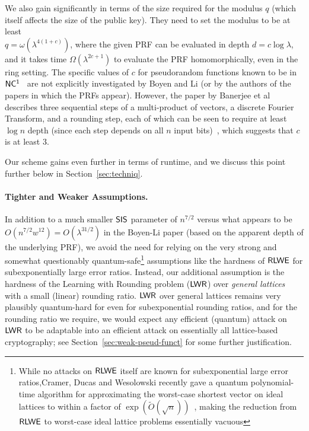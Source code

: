 We also gain significantly in terms of the size required for the
modulus $q$ (which itself affects the size of the public key). They
need to set the modulus to be at least\\ $q=\omega(\lambda^{4(1+c)})$,
where the given PRF can be evaluated in depth $d=c\log{\lambda}$, and
it takes time $\Omega(\lambda^{2c+1})$ to evaluate the PRF
homomorphically, even in the ring setting. The specific values of $c$
for pseudorandom functions known to be in
$\mathsf{NC^{1}}$~\cite{DBLP:conf/eurocrypt/BanerjeePR12,DBLP:conf/crypto/0001P14,DBLP:journals/jacm/NaorR04,DBLP:conf/crypto/DottlingS15}
are not explicitly investigated by Boyen and Li (or by the authors of
the papers in which the PRFs appear). However, the paper by Banerjee
et al describes three sequential steps of a multi-product of vectors,
a discrete Fourier Transform, and a rounding step, each of which can
be seen to require at least $\log{n}$ depth (since each step depends
on all $n$ input bits)~\cite{DBLP:journals/siamcomp/ReifT92}, which suggests that $c$ is at least $3$.


Our scheme gains even further in terms of runtime, and we discuss this point further below in Section~\ref{sec:techniq}.

\paragraph{Tighter and Weaker Assumptions.}


In addition to a much smaller $\mathsf{SIS}$ parameter of $n^{7/2}$ versus
what appears to be $O(n^{7/2}w^{12})=O(\lambda^{31/2})$ in the
Boyen-Li paper (based on the apparent depth of the underlying PRF), we
avoid the need for relying on the very strong and somewhat
questionably quantum-safe\footnote{While no attacks on $\mathsf{RLWE}$ itself
  are known for subexponential large error ratios,Cramer, Ducas and
  Wesolowski recently gave a quantum polynomial-time algorithm for
  approximating the worst-case shortest vector on ideal lattices to
  within a factor of
  $\exp(\tilde{O}(\sqrt{n}))$~\cite{DBLP:journals/iacr/DucasS16},
  making the reduction from $\mathsf{RLWE}$ to worst-case ideal lattice
  problems essentially vacuous} assumptions like the hardness of
$\mathsf{RLWE}$ for subexponentially large error ratios. Instead, our
additional assumption is the hardness of the Learning with Rounding
problem ($\mathsf{LWR}$) over \emph{general lattices} with a small (linear)
rounding ratio. $\mathsf{LWR}$ over general lattices remains very plausibly
quantum-hard for even for subexponential rounding ratios, and for the
rounding ratio we require, we would expect any efficient (quantum)
attack on $\mathsf{LWR}$ to be adaptable into an efficient attack on
essentially all lattice-based cryptography; see
Section~\ref{sec:weak-pseud-funct} for some further justification.

